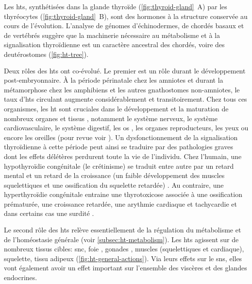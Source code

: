 \documentclass[../main.tex]{subfiles}
\begin{document}


Les \glspl{ht}, synthétisées dans la glande thyroïde (\autoref{fig:thyroid-gland}~A) par les thyréocytes (\autoref{fig:thyroid-gland}~B), sont des hormones à la structure conservée au cours de l'évolution.
L'analyse de génomes d'échinodermes, de chordés basaux et de vertébrés suggère que la machinerie nécessaire au métabolisme et à la signalisation thyroïdienne est un caractère ancestral des chordés, voire des deutérostomes \citep{Paris2008} (\autoref{fig:ht-tree}).



Deux rôles des \glspl{ht} ont co-évolué.
Le premier est un rôle durant le développement post-embryonnaire.
À la période périnatale chez les amniotes et durant la métamorphose chez les amphibiens et les autres gnathostomes non-amniotes, le taux d'\glspl{ht} circulant augmente considérablement et transitoirement.
Chez tous ces organismes, les \gls{ht} sont cruciales dans le développement et la maturation de nombreux organes et tissus \citep{Boelaert2005}, notamment le système nerveux, le système cardiovasculaire, le système digestif, les os \citep{Wojcicka2013a}, les organes reproducteurs, les yeux ou encore les oreilles (pour revue voir \citealp{Wagner2008,Ojamaa2010}).
Un dysfonctionnement de la signalisation thyroïdienne à cette période peut ainsi se traduire par des pathologies graves dont les effets délétères perdurent toute la vie de l'individu.
Chez l'humain, une hypothyroïdie congénitale (le crétinisme) se traduit entre autre par un retard mental et un retard de la croissance (un faible développement des muscles squelettiques et une ossification du squelette retardée) \citep{Zimmermann2009}.
Au contraire, une hyperthyroïdie congénitale entraine une thyrotoxicose associée à une ossification prématurée, une croissance retardée, une arythmie cardiaque et tachycardie et dans certains cas une surdité \citep{Krude1997}.
\par
Le second rôle des \glspl{ht} relève essentiellement de la régulation du métabolisme et de l'homéostasie générale (voir \autoref{subsec:ht-metabolism}).
Les \glspl{ht} agissent sur de nombreux tissus cibles: \gls{snc}, foie \citep{Weitzel2003}, gonades \citep{Wagner2008}, muscles (squelettiques et cardiaque), squelette, tissu adipeux (\autoref{fig:ht-general-actions}).
Via leurs effets sur le \gls{sns}, elles vont également avoir un effet important sur l'ensemble des viscères et des glandes endocrines.
\end{document}
